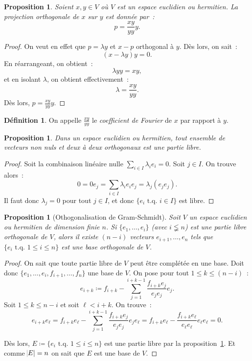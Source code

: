 \documentclass{article}
\newcommand{\tq}{\textrm{ t.q. }}
\newtheorem{prp}[thm]{Proposition}
\theoremstyle{definition}
\newtheorem{déf}[thm]{Définition}
\theoremstyle{remark}
\begin{document}
		\begin{prp} Soient $x, y \in V$ où $V$ est un espace euclidien ou hermitien. La \emph{projection orthogonale de $x$ sur $y$} est donnée par~:
		\[p = \frac {xy}{yy}y.\]
		\end{prp}

		\begin{proof} On veut en effet que $p = \lambda y$ et $x - p$ orthogonal à $y$. Dès lors, on sait~:
		\[(x - \lambda y)y = 0.\]
		En réarrangeant, on obtient~:
		\[\lambda yy = xy,\]
		et en isolant $\lambda$, on obtient effectivement~:
		\[\lambda = \frac {xy}{yy}.\]
		Dès lors, $p = \frac {xy}{yy}y$.
		\end{proof}

		\begin{déf} On appelle $\frac {xy}{yy}$ le \emph{coefficient de Fourier} de $x$ par rapport à $y$.
		\end{déf}

		\begin{prp}\label{prp:vectorthogonauxlibre} Dans un espace euclidien ou hermitien, tout ensemble de vecteurs non nuls et deux à deux orthogonaux est
		une partie libre.
		\end{prp}

		\begin{proof} Soit la combinaison linéaire nulle $\sum_{i \in I}\lambda_ie_i = 0$. Soit $j \in I$. On trouve alors~:
		\[0 = 0e_j = \sum_{i \in I}\lambda_ie_ie_j = \lambda_j(e_je_j).\]
		Il faut donc $\lambda_j = 0$ pour tout $j \in I$, et donc $\{e_i \tq i \in I\}$ est libre.
		\end{proof}

		\begin{prp}[Othogonalisation de Gram-Schmidt] Soit $V$ un espace euclidien ou hermitien de dimension finie $n$. Si $\{e_1, \dotsc, e_i\}$ (avec
		$i \lneqq n$) est une partie libre orthogonale de $V$, alors il existe $(n-i)$ vecteurs $e_{i+1}, \dotsc, e_n$ tels que $\{e_i \tq 1 \leq i \leq n\}$
		est une base orthogonale de $V$.
		\end{prp}

		\begin{proof} On sait que toute partie libre de $V$ peut être complétée en une base. Doit donc $\{e_1, \dotsc, e_i, f_{i+1}, \dotsc, f_n\}$ une base
		de $V$. On pose pour tout $1 \leq k \leq (n-i)$~:
		\[e_{i+k} \coloneqq f_{i+k} - \sum_{j=1}^{i+k-1}\frac {f_{i+k}e_j}{e_je_j}e_j.\]
		Soit $1 \leq k \leq n-i$ et soit $\ell < i+k$. On trouve~:
		\[e_{i+k}e_\ell = f_{i+k}e_\ell - \sum_{j=1}^{i+k-1}\frac {f_{i+k}e_j}{e_je_j}e_je_\ell
		= f_{i+k}e_\ell - \frac {f_{i+k}e_\ell}{e_\ell e_\ell}e_\ell e_\ell = 0.\]

		Dès lors, $E \coloneqq \{e_i \tq 1 \leq i \leq n\}$ est une partie libre par la proposition~\ref{prp:vectorthogonauxlibre}. Et comme $\abs E = n$ on
		sait que $E$ est une base de $V$.
		\end{proof}
\end{document}

